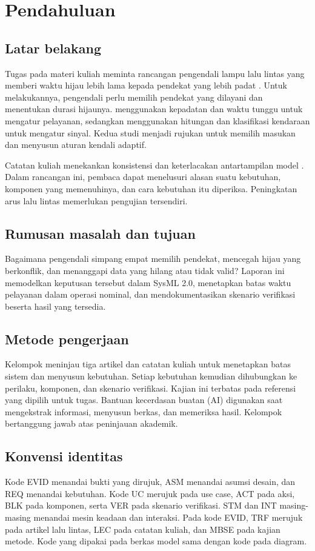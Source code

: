 \section{Pendahuluan}
\subsection{Latar belakang}
Tugas pada materi kuliah meminta rancangan pengendali lampu lalu lintas yang memberi waktu hijau lebih lama kepada pendekat yang lebih padat \parencite[bagian 21]{lecture02}. Untuk melakukannya, pengendali perlu memilih pendekat yang dilayani dan menentukan durasi hijaunya. \textcite{mondal2022} menggunakan kepadatan dan waktu tunggu untuk mengatur pelayanan, sedangkan \textcite{mathiane2023} menggunakan hitungan dan klasifikasi kendaraan untuk mengatur sinyal. Kedua studi menjadi rujukan untuk memilih masukan dan menyusun aturan kendali adaptif.

Catatan kuliah menekankan konsistensi dan keterlacakan antartampilan model \parencite[bagian 9--10]{lecture01}. Dalam rancangan ini, pembaca dapat menelusuri alasan suatu kebutuhan, komponen yang memenuhinya, dan cara kebutuhan itu diperiksa. Peningkatan arus lalu lintas memerlukan pengujian tersendiri.

\subsection{Rumusan masalah dan tujuan}
Bagaimana pengendali simpang empat memilih pendekat, mencegah hijau yang berkonflik, dan menanggapi data yang hilang atau tidak valid? Laporan ini memodelkan keputusan tersebut dalam SysML 2.0, menetapkan batas waktu pelayanan dalam operasi nominal, dan mendokumentasikan skenario verifikasi beserta hasil yang tersedia.

\subsection{Metode pengerjaan}
Kelompok meninjau tiga artikel dan catatan kuliah untuk menetapkan batas sistem dan menyusun kebutuhan. Setiap kebutuhan kemudian dihubungkan ke perilaku, komponen, dan skenario verifikasi. Kajian ini terbatas pada referensi yang dipilih untuk tugas. Bantuan kecerdasan buatan (AI) digunakan saat mengekstrak informasi, menyusun berkas, dan memeriksa hasil. Kelompok bertanggung jawab atas peninjauan akademik.

\subsection{Konvensi identitas}
Kode EVID menandai bukti yang dirujuk, ASM menandai asumsi desain, dan REQ menandai kebutuhan. Kode UC merujuk pada use case, ACT pada aksi, BLK pada komponen, serta VER pada skenario verifikasi. STM dan INT masing-masing menandai mesin keadaan dan interaksi. Pada kode EVID, TRF merujuk pada artikel lalu lintas, LEC pada catatan kuliah, dan MBSE pada kajian metode. Kode yang dipakai pada berkas model sama dengan kode pada diagram.
